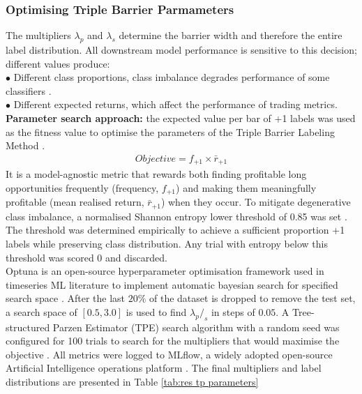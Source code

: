 \subsubsection{Optimising Triple Barrier Parmameters}
The multipliers $\lambda_p$ and $\lambda_s$ determine the barrier width and therefore the entire label distribution. All downstream model performance is sensitive to this decision; different values produce:\\
$\bullet$ Different class proportions, class imbalance degrades performance of some classifiers \cite{lopezdepradoAdvancesFinancialMachine2018}.\\
$\bullet$ Different expected returns, which affect the performance of trading metrics.\\
\textbf{Parameter search approach:} the expected value per bar of +1 labels was used as the fitness value to optimise the parameters of the Triple Barrier Labeling Method \cite{fuEnhancedGeneticAlgorithmDrivenTriple2024}.
\begin{gather}
Objective =  f_{+1} \times \bar{r}_{+1} \label{eq: tp objective}
\end{gather}
It is a model-agnostic metric that rewards both finding profitable long opportunities frequently (frequency, $f_{+1}$) and making them meaningfully profitable (mean realised return, $\bar{r}_{+1}$) when they occur. To mitigate degenerative class imbalance, a normalised Shannon entropy lower threshold of 0.85 was set \cite{deduEntropyBasedPortfolioOptimization2026}. The threshold was determined empirically to achieve a sufficient proportion +1 labels while preserving class distribution. Any trial with entropy below this threshold was scored 0 and discarded.\\
Optuna is an open-source hyperparameter optimisation framework \cite{OptunaHyperparameterOptimization} used in timeseries ML literature to implement automatic bayesian search for specified search space \cite{stoikovMarketMakingCrypto2025, bieganowskiSupervisedAutoencoderMLP2025}. After the last $20\%$ of the dataset is dropped to remove the test set, a search space of $[0.5, 3.0]$ is used to find $\lambda_p/_s$ in steps of $0.05$. A Tree-structured Parzen Estimator (TPE) search algorithm with a random seed was configured for 100 trials to search for the multipliers that would maximise the objective \cite{ozakiMultiobjectiveTreeStructuredParzen2022}. All metrics were logged to MLflow, a widely adopted open-source Artificial Intelligence operations platform \cite{MLflowOpenSource}. The final multipliers and label distributions are presented in Table \ref{tab:res tp parameters}
